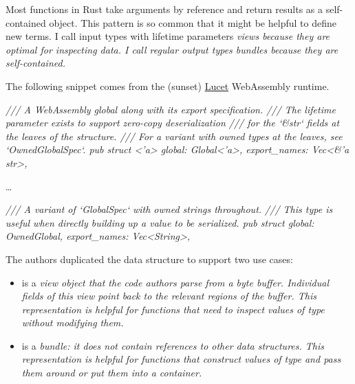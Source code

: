 \documentclass{article}
\begin{document}
Most functions in Rust take arguments by reference and return results as a self-contained object.
This pattern is so common that it might be helpful to define new terms.
I call input types with lifetime parameters \em{views} because they are optimal for inspecting data.
I call regular output types \em{bundles} because they are self-contained.

The following snippet comes from the (sunset) \href{https://github.com/bytecodealliance/lucet}{Lucet} WebAssembly runtime.
\begin{code}[rust]
\em{/// A WebAssembly global along with its export specification.}
\em{/// The lifetime parameter exists to support zero-copy deserialization}
\em{/// for the `\&str` fields at the leaves of the structure.}
\em{/// For a variant with owned types at the leaves, see `OwnedGlobalSpec`.}
pub struct \href{https://github.com/bytecodealliance/lucet/blob/51fb1ed414fe44f842db437d94abb6eb439d7c92/lucet-module/src/globals.rs#L8}{}<'a> {
    global: Global<'a>,
    export_names: Vec<&'a str>,
}

\ldots 

\em{/// A variant of `GlobalSpec` with owned strings throughout.}
\em{/// This type is useful when directly building up a value to be serialized.}
pub struct \href{https://github.com/bytecodealliance/lucet/blob/51fb1ed414fe44f842db437d94abb6eb439d7c92/lucet-module/src/globals.rs#L112}{} {
    global: OwnedGlobal,
    export_names: Vec<String>,
}
\end{code}

The authors duplicated the  data structure to support two use cases:
\begin{itemize}
  \item
     is a \em{view} object that the code authors parse from a byte buffer.
    Individual fields of this view point back to the relevant regions of the buffer.
    This representation is helpful for functions that need to inspect values of type  without modifying them.
  \item
     is a \em{bundle}: it does not contain references to other data structures.
    This representation is helpful for functions that construct values of type  and pass them around or put them into a container.
\end{itemize}
\end{document}
